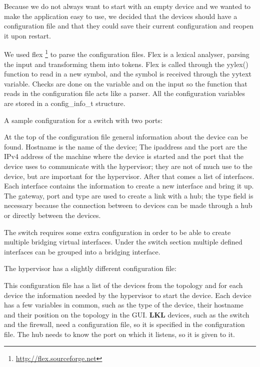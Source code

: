 Because we do not always want to start with an empty device and we wanted to make the application easy to use, we decided that the
devices should have a configuration file and that they could save their current configuration and reopen it upon restart. 

We used flex \footnote{\url{http://flex.sourceforge.net}} to parse the configuration files. Flex is a lexical analyser, 
parsing the input and transforming them into tokens. Flex is called through the yylex() function to read in a new symbol, and the
symbol is received through the yytext variable. Checks are done on the variable and on the input so the function that reads in 
the configuration file acts like a parser. All the configuration variables are stored in a config_info_t structure.

A sample configuration for a switch with two ports:
\lstset{language=text,caption=Example switch configuration file,label=lst:dconf}


At the top of the configuration file general information about the device can be found. Hostname is the name of the device;
The ipaddress and the port are the IPv4 address of the machine where the device is started and the port that the device
uses to communicate with the hypervisor; they are not of much use to the device, but are important for the hypervisor.
After that comes a list of interfaces.	Each interface contains the information to create a new interface and bring it up.
The gateway, port and type are used to create a link with a hub; the type field is necessary because the connection between
to devices can be made through a hub or directly between the devices. 

The switch requires some extra configuration in order to be able to create multiple bridging virtual interfaces. 
Under the switch section multiple defined interfaces can be grouped into a bridging interface.

The hypervisor has a slightly different configuration file:
\lstset{language=text,caption=Example hypervisor configuration file,label=lst:hconf}

This configuration file has a list of the devices from the topology and for each device the information needed by the hypervisor to
start the device. Each device has a few variables in common, such as the type of the device, their hostname and their position on
the topology in the GUI. \textbf{LKL} devices, such as the switch and the firewall, need a configuration file, so it is specified in the
configuration file. The hub needs to know the port on which it listens, so it is given to it.


